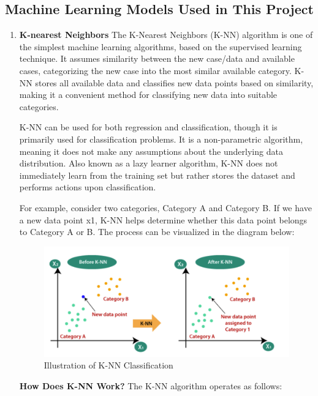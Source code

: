 \subsection{Machine Learning Models Used in This Project}
\begin{enumerate}
	\item \textbf{K-nearest Neighbors}
	The K-Nearest Neighbors (K-NN) algorithm is one of the simplest machine learning algorithms, based on the supervised learning technique. It assumes similarity between the new case/data and available cases, categorizing the new case into the most similar available category. K-NN stores all available data and classifies new data points based on similarity, making it a convenient method for classifying new data into suitable categories.
	
	K-NN can be used for both regression and classification, though it is primarily used for classification problems. It is a non-parametric algorithm, meaning it does not make any assumptions about the underlying data distribution. Also known as a lazy learner algorithm, K-NN does not immediately learn from the training set but rather stores the dataset and performs actions upon classification.
	
	For example, consider two categories, Category A and Category B. If we have a new data point x1, K-NN helps determine whether this data point belongs to Category A or B. The process can be visualized in the diagram below:
	\begin{figure}[h]
		\centering
		\includegraphics[width=1\textwidth]{picture/KNN1}
		\caption{Illustration of K-NN Classification}
		\label{fig:knn1}
	\end{figure}
	
	\textbf{How Does K-NN Work?}
	The K-NN algorithm operates as follows:
	

\end{enumerate}
